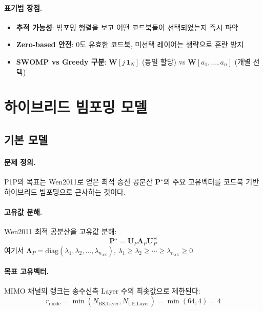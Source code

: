 \documentclass[10pt]{article}
\begin{document}
\paragraph{표기법 장점.}
\begin{itemize}
    \item \textbf{추적 가능성}: 빔포밍 행렬을 보고 어떤 코드북들이 선택되었는지 즉시 파악
    \item \textbf{Zero-based 안전}: $0$도 유효한 코드북, 미선택 레이어는 생략으로 혼란 방지
    \item \textbf{SWOMP vs Greedy 구분}: $\mathbf{W}[j\,\mathbf{1}_N]$ (동일 할당) vs $\mathbf{W}[a_1, \ldots, a_n]$ (개별 선택)
\end{itemize}

\section{하이브리드 빔포밍 모델}

\subsection{기본 모델}

\paragraph{문제 정의.}
P1P의 목표는 Wen2011로 얻은 최적 송신 공분산 $\mathbf{P}^{\star}$의 주요 고유벡터를 코드북 기반 하이브리드 빔포밍으로 근사하는 것이다.

\paragraph{고유값 분해.}
Wen2011 최적 공분산을 고유값 분해:
\begin{equation}
\mathbf{P}^{\star} = \mathbf{U}_{P} \boldsymbol{\Lambda}_{P} \mathbf{U}_{P}^{\mathsf{H}}
\end{equation}
여기서 $\boldsymbol{\Lambda}_{P} = \text{diag}(\lambda_1, \lambda_2, \ldots, \lambda_{n_{\text{AE}}})$, $\lambda_1 \geq \lambda_2 \geq \cdots \geq \lambda_{n_{\text{AE}}} \geq 0$

\paragraph{목표 고유벡터.}
MIMO 채널의 랭크는 송수신측 Layer 수의 최솟값으로 제한된다:
\begin{equation}
r_{\text{mode}} = \min(N_{\text{BS,Layer}}, N_{\text{UE,Layer}}) = \min(64, 4) = 4
\end{equation}
\end{document}
